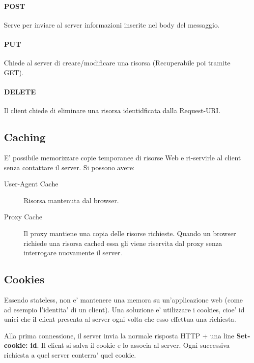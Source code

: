 \paragraph{POST} Serve per inviare al server informazioni inserite nel body del messaggio.
\paragraph{PUT} Chiede al server di creare/modificare una risorsa (Recuperabile poi tramite GET).
\paragraph{DELETE} Il client chiede di eliminare una risorsa identidficata dalla Request-URI.
\subsection{Caching}
E' possibile memorizzare copie temporanee di risorse Web e ri-servirle al client senza contattare il server.
Si possono avere:
\begin{description}
    \item[User-Agent Cache] Risorsa mantenuta dal browser.
    \item[Proxy Cache] Il proxy mantiene una copia delle risorse richieste. Quando un browser richiede una risorsa cached essa gli viene riservita dal proxy senza interrogare nuovamente il server.
\end{description}
\subsection{Cookies}
Essendo stateless, non e' mantenere una memora su un'applicazione web (come ad esempio l'identita' di un client).
Una soluzione e' utilizzare i cookies, cioe' id unici che il client presenta al server ogni volta che esso effettua una richiesta.

Alla prima connessione, il server invia la normale risposta HTTP + una line \textbf{Set-cookie: id}.
Il client si salva il cookie e lo associa al server. Ogni successiva richiesta a quel server conterra' quel cookie.
